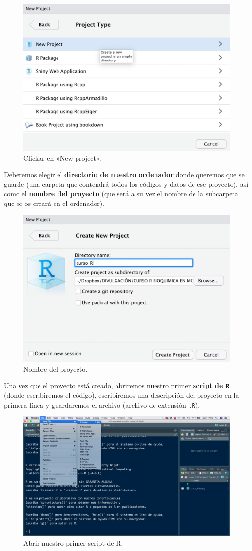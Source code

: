 \documentclass[11pt,]{book}
\begin{document}
\begin{figure}

{\centering \includegraphics[width=0.5\linewidth]{./img/crear_proyecto3} 

}

\caption{Clickar en «New project».}\label{fig:crear-proyecto3}
\end{figure}

Deberemos elegir el \textbf{directorio de nuestro ordenador} donde queremos que se guarde (una carpeta que contendrá todos los códigos y datos de ese proyecto), así como el \textbf{nombre del proyecto} (que será a su vez el nombre de la subcarpeta que se os creará en el ordenador).

\begin{figure}

{\centering \includegraphics[width=0.5\linewidth]{./img/crear_proyecto4} 

}

\caption{Nombre del proyecto.}\label{fig:crear-proyecto4}
\end{figure}

Una vez que el proyecto está creado, abriremos nuestro primer \textbf{script de \texttt{R}} (donde escribiremos el código), escribiremos una descripción del proyecto en la primera línea y guardaremos el archivo (archivo de extensión \texttt{.R}).

\begin{figure}

{\centering \includegraphics[width=0.5\linewidth]{./img/crear_proyecto5} 

}

\caption{Abrir nuestro primer script de R.}\label{fig:crear-proyecto5}
\end{figure}
\end{document}
